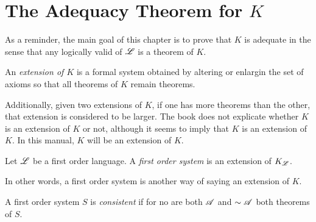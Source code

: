 \section{The Adequacy Theorem for \texorpdfstring{\(K\)}{K}}

As a reminder, the main goal of this chapter is to prove that \(K\) is adequate in the sense that any logically valid \wf{} of \(\mathscr{L}\) is a theorem of \(K\).

\setcounter{definition}{31}
\begin{definition}
  An \textit{extension of \(K\)} is a formal system obtained by altering or enlargin the set of axioms so that all theorems of \(K\) remain theorems.
\end{definition}

Additionally, given two extensions of \(K\), if one has more theorems than the other, that extension is considered to be larger. The book does not explicate whether \(K\) is an extension of \(K\) or not, although it seems to imply that \(K\) is an extension of \(K.\) In this manual, \(K\) will be an extension of \(K\).

\begin{definition}
   Let \(\mathscr{L}\) be a first order language. A \textit{first order system} is an extension of \(K_{\mathscr{L}}\).
\end{definition}

In other words, a first order system is another way of saying an extension of \(K\).

\begin{definition}
  A first order system \(S\) is \textit{consistent} if for no \wf{} are both \(\mathscr{A}\) and \(\sim\mathscr{A}\) both theorems of \(S\).
\end{definition}

